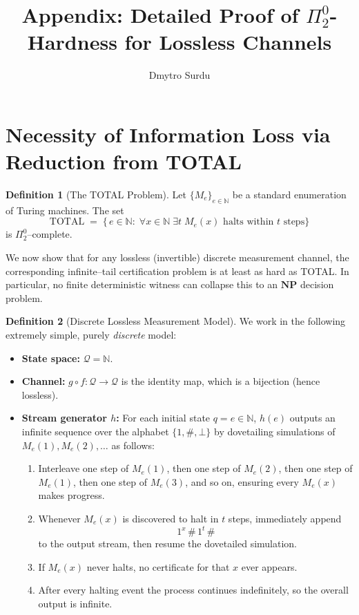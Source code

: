 \documentclass[12pt]{article}
\title{\textbf{Appendix: Detailed Proof of $\Pi^0_2$-Hardness for Lossless Channels}}
\author{Dmytro Surdu}
\date{}
\theoremstyle{definition}
\newtheorem*{definition}{Definition}
\theoremstyle{plain}
\begin{document}
\maketitle

\section*{Necessity of Information Loss via Reduction from \textsc{TOTAL}}

\begin{definition}[The \textsc{TOTAL} Problem]
Let $\{M_e\}_{e\in\mathbb N}$ be a standard enumeration of Turing machines.  The set
\[
\mathrm{TOTAL} \;=\;\bigl\{\,e\in\mathbb N:\;\forall x\in\mathbb N\;\exists t\;M_e(x)\text{ halts within }t\text{ steps}\bigr\}
\]
is $\Pi^0_2$–complete.
\end{definition}

We now show that for any lossless (invertible) discrete measurement channel, the corresponding infinite–tail certification problem is at least as hard as \textsc{TOTAL}.  In particular, no finite deterministic witness can collapse this to an $\mathbf{NP}$ decision problem.

\begin{definition}[Discrete Lossless Measurement Model]
We work in the following extremely simple, purely \emph{discrete} model:
\begin{itemize}
  \item \textbf{State space:} $\mathcal Q=\mathbb N$.
  \item \textbf{Channel:} $g\circ f : \mathcal Q\to\mathcal Q$ is the identity map, which is a bijection (hence lossless).
  \item \textbf{Stream generator $h$:} For each initial state $q=e\in\mathbb N$, $h(e)$ outputs an infinite sequence over the alphabet $\{1,\#, \bot\}$ by dovetailing simulations of $M_e(1),M_e(2),\dots$ as follows:
    \begin{enumerate}
      \item Interleave one step of $M_e(1)$, then one step of $M_e(2)$, then one step of $M_e(1)$, then one step of $M_e(3)$, and so on, ensuring every $M_e(x)$ makes progress.
      \item Whenever $M_e(x)$ is discovered to halt in $t$ steps, immediately append
        \[
          1^x\,\#\,1^t\,\#
        \]
        to the output stream, then resume the dovetailed simulation.
      \item If $M_e(x)$ never halts, no certificate for that $x$ ever appears.
      \item After every halting event the process continues indefinitely, so the overall output is infinite.
    \end{enumerate}
\end{itemize}
\end{definition}
\end{document}

